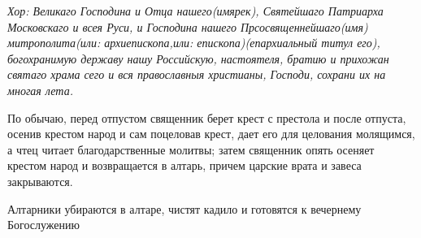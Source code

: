

\itshape  Хор:\normalfont{} Великаго Господина и Отца нашего\itshape  (имярек\normalfont{}), Святейшаго Патриарха Московскаго и всея Руси, и Господина нашего Прсосвященнейшаго\itshape  (имя)\normalfont{} митрополита\itshape  (или:\normalfont{} архиепископа,\itshape  или:\normalfont{} епископа)\itshape  (епархиальный титул его),\normalfont{} богохранимую державу нашу Российскую, настоятеля, братию и прихожан святаго храма сего и вся православныя христианы, Господи, сохрани их на многая лета.


\medskip  По обычаю, перед отпустом священник берет крест с престола и после отпуста, осенив крестом народ и сам поцеловав крест, дает его для целования молящимся, а чтец читает благодарственные молитвы; затем священник опять осеняет крестом народ и возвращается в алтарь, причем царские врата и завеса закрываются.


  Алтарники убираются в алтаре, чистят кадило и готовятся к вечернему Богослужению
\mychapterending
